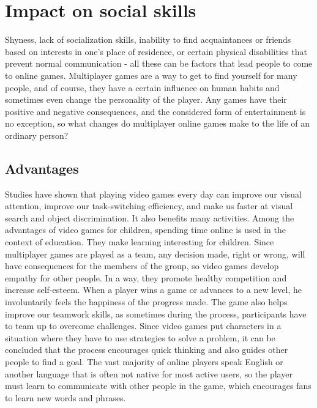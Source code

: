 \documentclass[10pt,twoside,slovak,a4paper]{article}
\begin{document}
\section{Impact on social skills} 

  Shyness, lack of socialization skills, inability to find acquaintances or friends based on interests in one's place of residence, or certain physical disabilities that prevent normal communication - all these can be factors that lead people to come to online games. Multiplayer games are a way to get to find yourself for many people, and of course, they have a certain influence on human habits and sometimes even change the personality of the player. Any games have their positive and negative consequences, and the considered form of entertainment is no exception, so what changes do multiplayer online games make to the life of an ordinary person?

\cite{Coplien:MPD}\cite{ Czarnecki:Progress}\cite{PLP-Framework}


\subsection{Advantages} \label{ina:nejake}
  

  Studies have shown that playing video games every day can improve our visual attention, improve our task-switching efficiency, and make us faster at visual search and object discrimination. It also benefits many activities. Among the advantages of video games for children, spending time online is used in the context of education. They make learning interesting for children. Since multiplayer games are played as a team, any decision made, right or wrong, will have consequences for the members of the group, so video games develop empathy for other people. In a way, they promote healthy competition and increase self-esteem. When a player wins a game or advances to a new level, he involuntarily feels the happiness of the progress made. The game also helps improve our teamwork skills, as sometimes during the process, participants have to team up to overcome challenges. Since video games put characters in a situation where they have to use strategies to solve a problem, it can be concluded that the process encourages quick thinking and also guides other people to find a goal. The vast majority of online players speak English or another language that is often not native for most active users, so the player must learn to communicate with other people in the game, which encourages fans to learn new words and phrases.
\end{document}
